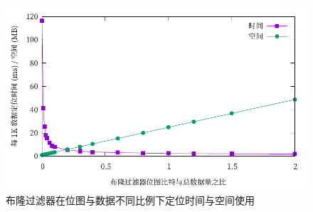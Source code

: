 \documentclass{mydoc}
\begin{document}
\begin{figure}[htbp]
  \centering
  \includegraphics{figure/benchmark-bloom.pdf}
  \caption{布隆过滤器在位图与数据不同比例下定位时间与空间使用}%
  \label{fig:bloom-test}
\end{figure}

\clearpage
\end{document}
